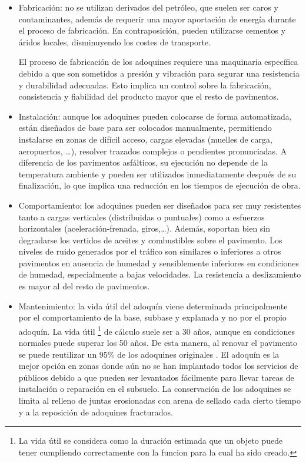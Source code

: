 \begin{itemize}
\item Fabricación: no se utilizan derivados del petróleo, que suelen ser caros y contaminantes, además de requerir una mayor aportación de energía durante el proceso de fabricación. En contraposición, pueden utilizarse cementos y áridos locales, disminuyendo los costes de transporte.

El proceso de fabricación de los adoquines requiere una maquinaria específica debido a que son sometidos a presión y vibración para segurar una resistencia y durabilidad adecuadas. Esto implica un control sobre la fabricación, consistencia y fiabilidad del producto mayor que el resto de pavimentos.

\item Instalación: aunque los adoquines pueden colocarse de forma automatizada, están diseñados de base para ser colocados manualmente, permitiendo instalarse en zonas de difícil acceso, cargas elevadas (muelles de carga, aeropuertos, \ldots), resolver trazados complejos o pendientes pronunciadas. A diferencia de los pavimentos asfálticos, su ejecución no depende de la temperatura ambiente y pueden ser utilizados inmediatamente después de su finalización, lo que implica una reducción en los tiempos de ejecución de obra.

\item Comportamiento: los adoquines pueden ser diseñados para ser muy resistentes tanto a cargas verticales (distribuidas o puntuales) como a esfuerzos horizontales (aceleración-frenada, giros,\ldots). Además, soportan bien sin degradarse los vertidos de aceites y combustibles sobre el pavimento. Los niveles de ruido generados por el tráfico son similares o inferiores a otros pavimentos en ausencia de humedad y sensiblemente inferiores en condiciones de humedad, especialmente a bajas velocidades. La resistencia a deslizamiento es mayor al del resto de pavimentos.

\item Mantenimiento: la vida útil del adoquín viene determinada principalmente por el comportamiento de la base, subbase y explanada y no por el propio adoquín. La vida útil \footnote{La vida útil se considera como la duración estimada que un objeto puede tener cumpliendo correctamente con la funcion para la cual ha sido creado.} de cálculo suele ser a 30 años, aunque en condiciones normales puede superar los 50 años. De esta manera, al renovar el pavimento se puede reutilizar un 95\% de los adoquines originales \cite{euroadoquin}. El adoquín es la mejor opción en zonas donde aún no se han implantado todos los servicios de públicos debido a que pueden ser levantados fácilmente para llevar tareas de instalación o reparación en el subsuelo. La conservación de los adoquines se limita al relleno de juntas erosionadas con arena de sellado cada cierto tiempo y a la reposición de adoquines fracturados.


\end{itemize}
